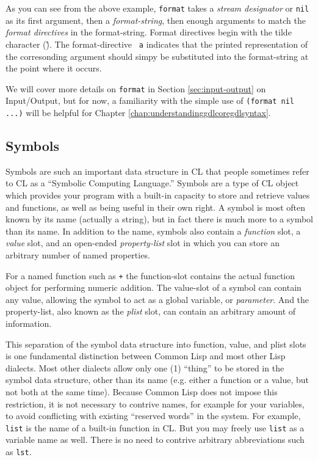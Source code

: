 \documentclass [11pt]{book}
\begin{document}
As you can see from the above example, \texttt{format} takes a \emph{stream designator} or \texttt{nil} as its first argument, then a \emph{format-string}, then enough arguments to match the \emph{format directives} in the format-string. Format directives begin with the
tilde character (\~).  The format-directive \texttt{~a} indicates that the printed representation of the corresonding argument should simpy be 
substituted into the format-string at the point where it occurs.



We will cover more details on \texttt{format} in Section 
\ref{sec:input-output} on Input/Output, but for now, a familiarity with the simple use of \texttt{(format nil ...)} will be helpful for Chapter 
\ref{chap:understandinggdlcoregdlsyntax}.



\subsection{Symbols}

\label{subsec:symbols}



Symbols are such an important data structure in CL that people
sometimes refer to CL as a ``Symbolic Computing Language.'' Symbols
are a type of CL object which provides your program with a built-in
capacity to store and retrieve values and functions, as well as being
useful in their own right. A symbol is most often known by its name
 (actually a string), but in fact there is much more to a symbol than
its name. In addition to the name, symbols also contain a \emph{function} slot, a \emph{value} slot, and an open-ended \emph{property-list} slot in which you can store an arbitrary number of named properties.



For a named function such as \texttt{+} the function-slot contains the actual function
object for performing numeric addition. The value-slot of a symbol can
contain any value, allowing the symbol to act as a global variable, or \emph{parameter}. And the property-list, also known as the \emph{plist} slot, can contain an arbitrary amount of information.



This separation of the symbol data structure into function, value, and
plist slots is one fundamental distinction between Common Lisp and most
other Lisp dialects. Most other dialects allow only one (1) ``thing''
to be stored in the symbol data structure, other than its name
 (e.g. either a function or a value, but not both at the same
time). Because Common Lisp does not impose this restriction, it is not
necessary to contrive names, for example for your variables, to avoid
conflicting with existing ``reserved words'' in the system. For
example, \texttt{list} is the name of a built-in function in CL. But you
may freely use \texttt{list} as a variable name as well. There is no need to
contrive arbitrary abbreviations such as \texttt{lst}.
\end{document}

